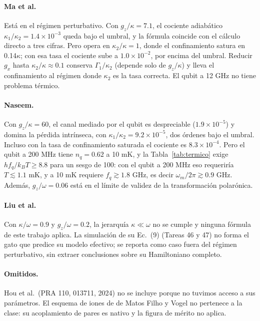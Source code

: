 \documentclass[11pt]{report}
\begin{document}
\paragraph{Ma et al.} Est\'a en el r\'egimen perturbativo. Con $g_{z}/\kappa=7.1$, el cociente adiab\'atico $\kappa_{1}/\kappa_{2}=1.4\times10^{-3}$ queda bajo el umbral, y la f\'ormula coincide con el c\'alculo directo a tres cifras. Pero opera en $\kappa_{2}/\kappa=1$, donde el confinamiento satura en 0.14$\kappa$; con esa tasa el cociente sube a $1.0\times10^{-2}$, por encima del umbral. Reducir $g_{x}$ hasta $\kappa_{2}/\kappa\approx0.1$ conserva $\Gamma_{1}/\kappa_{2}$ (depende solo de $g_{z}/\kappa$) y lleva el confinamiento al r\'egimen donde $\kappa_{2}$ es la tasa correcta. El qubit a 12 GHz no tiene problema t\'ermico.

\paragraph{Naseem.} Con $g_{z}/\kappa=60$, el canal mediado por el qubit es despreciable ($1.9\times10^{-5}$) y domina la p\'erdida intr\'inseca, con $\kappa_{1}/\kappa_{2}=9.2\times10^{-5}$, dos \'ordenes bajo el umbral. Incluso con la tasa de confinamiento saturada el cociente es $8.3\times10^{-4}$. Pero el qubit a 200 MHz tiene $n_{q}=0.62$ a 10 mK, y la Tabla~\ref{tab:termico} exige $hf_{q}/k_{B}T\geq8.8$ para un sesgo de 100: con el qubit a 200 MHz eso requerir\'ia $T\lesssim1.1$ mK, y a 10 mK requiere $f_{q}\gtrsim1.8$ GHz, es decir $\omega_{m}/2\pi\gtrsim0.9$ GHz. Adem\'as, $g_{z}/\omega=0.06$ est\'a en el l\'imite de validez de la transformaci\'on polar\'onica.

\paragraph{Liu et al.} Con $\kappa/\omega=0.9$ y $g_{z}/\omega=0.2$, la jerarqu\'ia $\kappa\ll\omega$ no se cumple y ninguna f\'ormula de este trabajo aplica. La simulaci\'on de su Ec.~(9) (Tareas 46 y 47) no forma el gato que predice su modelo efectivo; se reporta como caso fuera del r\'egimen perturbativo, sin extraer conclusiones sobre su Hamiltoniano completo.

\paragraph{Omitidos.} Hou et al.\ (PRA 110, 013711, 2024) no se incluye porque no tuvimos acceso a sus par\'ametros. El esquema de iones de de Matos Filho y Vogel no pertenece a la clase: su acoplamiento de pares es nativo y la figura de m\'erito no aplica.
\end{document}
